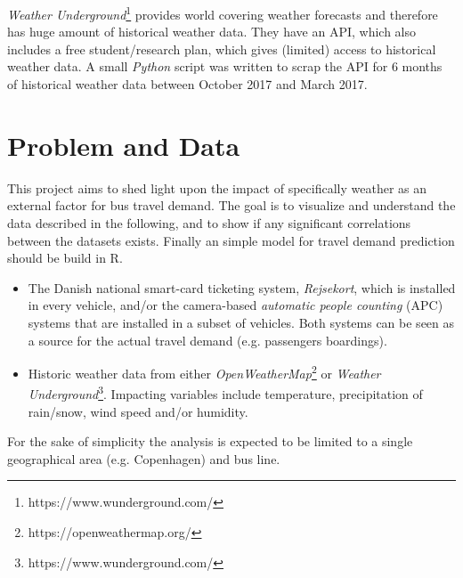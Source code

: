\documentclass[a4paper,11pt]{article}
\begin{document}
\emph{Weather Underground}\footnote{https://www.wunderground.com/} provides world covering weather forecasts and therefore has huge amount of historical weather data. They have an API, which also includes a free student/research plan, which gives (limited) access to historical weather data.
A small \emph{Python} script was written to scrap the API for 6 months of historical weather data between October 2017 and March 2017.

\section{Problem and Data}\label{ch:data_old}
This project aims to shed light upon the impact of specifically weather as an external factor for bus travel demand. The goal is to visualize and understand the data described in the following, and to show if any significant correlations between the datasets exists. Finally an simple model for travel demand prediction should be build in R.

\begin{itemize}
    \item The Danish national smart-card ticketing system, \emph{Rejsekort}, which is installed in every vehicle, and/or the camera-based \emph{automatic people counting} (APC) systems that are installed in a subset of vehicles. Both systems can be seen as a source for the actual travel demand (e.g. passengers boardings).
    \item Historic weather data from either \emph{OpenWeatherMap}\footnote{https://openweathermap.org/} or \emph{Weather Underground}\footnote{https://www.wunderground.com/}. Impacting variables include temperature, precipitation of rain/snow, wind speed and/or humidity.
\end{itemize}

For the sake of simplicity the analysis is expected to be limited to a single geographical area (e.g. Copenhagen) and bus line.

\begin{spacing}{1}
  
  
\end{spacing}
\end{document}
